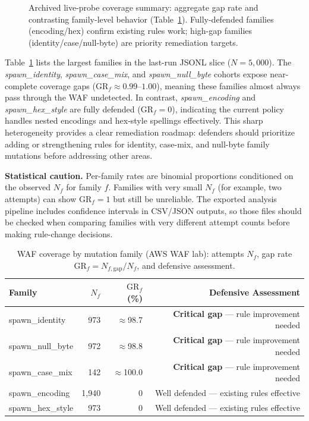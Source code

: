 \begin{figure}[t]
  \centering
  \caption{Archived live-probe coverage summary: aggregate gap rate and contrasting family-level behavior (Table~\ref{tab:bypass_categories}). Fully-defended families (encoding/hex) confirm existing rules work; high-gap families (identity/case/null-byte) are priority remediation targets.}
  \label{fig:bypass}
\end{figure}

Table~\ref{tab:bypass_categories} lists the largest families in the last-run JSONL slice ($N{=}5{,}000$). The \emph{spawn\_identity}, \emph{spawn\_case\_mix}, and \emph{spawn\_null\_byte} cohorts expose near-complete coverage gaps ($\mathrm{GR}_f\approx 0.99$--$1.00$), meaning these families almost always pass through the WAF undetected. In contrast, \emph{spawn\_encoding} and \emph{spawn\_hex\_style} are fully defended ($\mathrm{GR}_f=0$), indicating the current policy handles nested encodings and hex-style spellings effectively. This sharp heterogeneity provides a clear remediation roadmap: defenders should prioritize adding or strengthening rules for identity, case-mix, and null-byte family mutations before addressing other areas.

\textbf{Statistical caution.} Per-family rates are binomial proportions conditioned on the observed $N_f$ for family $f$. Families with very small $N_f$ (for example, two attempts) can show $\mathrm{GR}_f=1$ but still be unreliable. The exported analysis pipeline includes confidence intervals in CSV/JSON outputs, so those files should be checked when comparing families with very different attempt counts before making rule-change decisions.

\begin{table}[t]
  \centering
  \caption{WAF coverage by mutation family (AWS WAF lab): attempts $N_f$, gap rate $\mathrm{GR}_f{=}N_{f,\mathrm{gap}}/N_f$, and defensive assessment.}
  \label{tab:bypass_categories}
  \begin{tabular}{lrrr}
    \toprule
    Family & $N_f$ & $\mathrm{GR}_f$ (\%) & Defensive Assessment \\
    \midrule
    spawn\_identity & 973 & $\approx$98.7 & \textbf{Critical gap} --- rule improvement needed \\
    spawn\_null\_byte & 972 & $\approx$98.8 & \textbf{Critical gap} --- rule improvement needed \\
    spawn\_case\_mix & 142 & $\approx$100.0 & \textbf{Critical gap} --- rule improvement needed \\
    spawn\_encoding & 1{,}940 & $0$ & Well defended --- existing rules effective \\
    spawn\_hex\_style & 973 & $0$ & Well defended --- existing rules effective \\
    \bottomrule
  \end{tabular}
\end{table}

